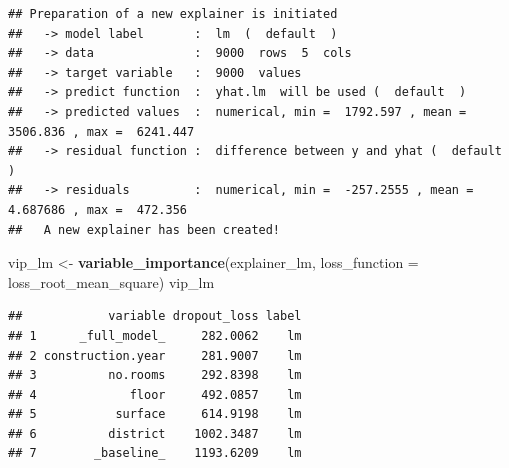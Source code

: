 \documentclass[12pt,]{krantz}
\newenvironment{Shaded}{\begin{snugshade}}{\end{snugshade}}
\newcommand{\DataTypeTok}[1]{\textcolor[rgb]{0.13,0.29,0.53}{#1}}
\newcommand{\DecValTok}[1]{\textcolor[rgb]{0.00,0.00,0.81}{#1}}
\newcommand{\KeywordTok}[1]{\textcolor[rgb]{0.13,0.29,0.53}{\textbf{#1}}}
\newcommand{\NormalTok}[1]{#1}
\newcommand{\OperatorTok}[1]{\textcolor[rgb]{0.81,0.36,0.00}{\textbf{#1}}}
\newcommand{\OtherTok}[1]{\textcolor[rgb]{0.56,0.35,0.01}{#1}}
\newcommand{\StringTok}[1]{\textcolor[rgb]{0.31,0.60,0.02}{#1}}
\begin{document}
\begin{Shaded}
\end{Shaded}

\begin{verbatim}
## Preparation of a new explainer is initiated
##   -> model label       :  lm  (  default  )
##   -> data              :  9000  rows  5  cols 
##   -> target variable   :  9000  values 
##   -> predict function  :  yhat.lm  will be used (  default  )
##   -> predicted values  :  numerical, min =  1792.597 , mean =  3506.836 , max =  6241.447  
##   -> residual function :  difference between y and yhat (  default  )
##   -> residuals         :  numerical, min =  -257.2555 , mean =  4.687686 , max =  472.356  
##   A new explainer has been created!
\end{verbatim}

\begin{Shaded}
\begin{Highlighting}[]
\NormalTok{vip_lm <-}\StringTok{ }\KeywordTok{variable_importance}\NormalTok{(explainer_lm, }
            \DataTypeTok{loss_function =}\NormalTok{ loss_root_mean_square)}
\NormalTok{vip_lm}
\end{Highlighting}
\end{Shaded}

\begin{verbatim}
##            variable dropout_loss label
## 1      _full_model_     282.0062    lm
## 2 construction.year     281.9007    lm
## 3          no.rooms     292.8398    lm
## 4             floor     492.0857    lm
## 5           surface     614.9198    lm
## 6          district    1002.3487    lm
## 7        _baseline_    1193.6209    lm
\end{verbatim}

\begin{Shaded}
\end{Shaded}
\end{document}
